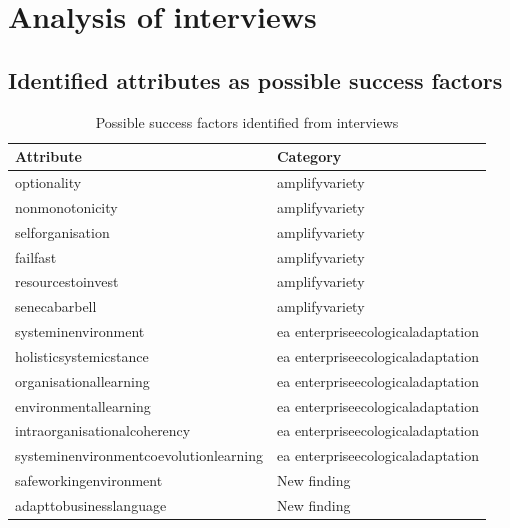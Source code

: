 \section{Analysis of interviews}


\subsection{Identified attributes as possible success factors}
\label{sub:identifiedattributesaspossiblesf}
\begin{table}[H]
	\begin{center}
			\begin{tabular}{@{}ll@{}}
				\toprule%
				\textbf{Attribute} & \textbf{Category}  \\%
				\midrule%
				\Gls{optionality} & \Gls{amplifyvariety} \\%
				\Gls{nonmonotonicity} & \Gls{amplifyvariety} \\%
				\Gls{selforganisation} & \Gls{amplifyvariety} \\%
				\Gls{failfast} & \Gls{amplifyvariety} \\%
				\Gls{resourcestoinvest} & \Gls{amplifyvariety} \\%
				\Gls{senecabarbell} & \Gls{amplifyvariety} \\%
				\Gls{systeminenvironment} & \acrshort{ea} \Gls{enterpriseecologicaladaptation} \\%
				\Gls{holisticsystemicstance} & \acrshort{ea} \Gls{enterpriseecologicaladaptation} \\%
				\Gls{organisationallearning} & \acrshort{ea} \Gls{enterpriseecologicaladaptation} \\%
				\Gls{environmentallearning} & \acrshort{ea} \Gls{enterpriseecologicaladaptation} \\%
				\Gls{intraorganisationalcoherency} & \acrshort{ea} \Gls{enterpriseecologicaladaptation} \\%
				\Gls{systeminenvironmentcoevolutionlearning} & \acrshort{ea} \Gls{enterpriseecologicaladaptation} \\%
				\Gls{safeworkingenvironment} & New finding \\%
				\Gls{adapttobusinesslanguage} & New finding \\%
				\bottomrule%
			\end{tabular}
		\caption{Possible success factors identified from interviews}
	\end{center}
\end{table}